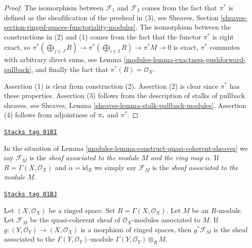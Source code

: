 \begin{proof}

The isomorphism between $\mathcal{F}_1$ and $\mathcal{F}_3$
comes from the fact that $\pi^*$ is defined as the sheafification
of the presheaf in (3), see Sheaves, Section
\ref{sheaves-section-ringed-spaces-functoriality-modules}.
The isomorphism between the constructions in (2) and (1) comes
from the fact that the functor $\pi^*$ is right exact, so
$\pi^*(\bigoplus_{j \in J} R) \to \pi^*(\bigoplus_{i \in I} R) \to
\pi^*M \to 0$ is exact, $\pi^*$ commutes with arbitrary
direct sums, see Lemma \ref{modules-lemma-exactness-pushforward-pullback},
and finally the fact that $\pi^*(R) = \mathcal{O}_X$.

\medskip\noindent
Assertion (1) is clear from construction (2).
Assertion (2) is clear since $\pi^*$ has these properties.
Assertion (3) follows from the description of stalks of
pullback sheaves, see
Sheaves, Lemma \ref{sheaves-lemma-stalk-pullback-modules}.
Assertion (4) follows from adjointness of $\pi_*$ and
$\pi^*$.
\end{proof}

\begin{definition}
\label{modules-definition-sheaf-associated}
\href{https://stacks.math.columbia.edu/tag/01BI}{\texttt{Stacks tag 01BI}}

In the situation of Lemma \ref{modules-lemma-construct-quasi-coherent-sheaves}
we say $\mathcal{F}_M$ is the {\it sheaf associated to the module $M$
and the ring map $\alpha$}. If $R = \Gamma(X, \mathcal{O}_X)$
and $\alpha = \text{id}_R$ we simply say $\mathcal{F}_M$ is the
{\it sheaf associated to the module $M$}.
\end{definition}


\begin{lemma}
\label{modules-lemma-restrict-quasi-coherent}
\href{https://stacks.math.columbia.edu/tag/01BJ}{\texttt{Stacks tag 01BJ}}

Let $(X, \mathcal{O}_X)$ be a ringed space.
Set $R = \Gamma(X, \mathcal{O}_X)$.
Let $M$ be an $R$-module.
Let $\mathcal{F}_M$ be the quasi-coherent sheaf of
$\mathcal{O}_X$-modules associated to $M$.
If $g : (Y, \mathcal{O}_Y) \to (X, \mathcal{O}_X)$
is a morphism of ringed spaces, then
$g^*\mathcal{F}_M$ is the sheaf associated
to the $\Gamma(Y, \mathcal{O}_Y)$-module
$\Gamma(Y, \mathcal{O}_Y) \otimes_R M$.
\end{lemma}

